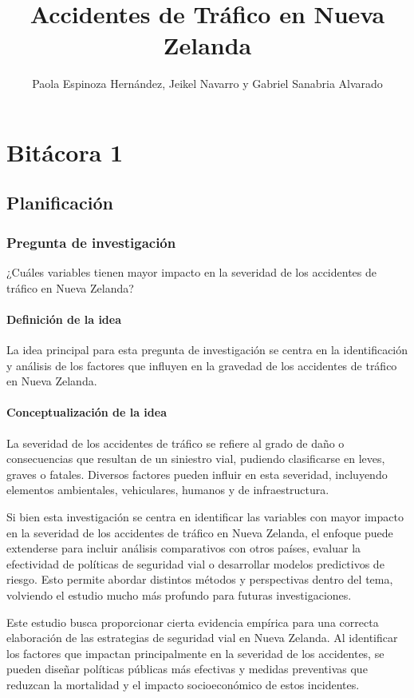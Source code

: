 \documentclass{book}
\title{Accidentes de Tráfico en Nueva Zelanda}
\author{Paola Espinoza Hernández, Jeikel Navarro y Gabriel Sanabria Alvarado}
\begin{document}
\maketitle


\chapter*{Bitácora 1}

\section{Planificación}

\subsection{Pregunta de investigación}
¿Cuáles variables tienen mayor impacto en la severidad de los accidentes de tráfico en Nueva Zelanda?

\subsubsection{Definición de la idea}

La idea principal para esta pregunta de investigación se centra en la identificación y análisis de los factores que influyen en la gravedad de los accidentes de tráfico en Nueva Zelanda. 

\subsubsection{Conceptualización de la idea}

La severidad de los accidentes de tráfico se refiere al grado de daño o consecuencias que resultan de un siniestro vial, pudiendo clasificarse en leves, graves o fatales. Diversos factores pueden influir en esta severidad, incluyendo elementos ambientales, vehiculares, humanos y de infraestructura.

Si bien esta investigación se centra en identificar las variables con mayor impacto en la severidad de los accidentes de tráfico en Nueva Zelanda, el enfoque puede extenderse para incluir análisis comparativos con otros países, evaluar la efectividad de políticas de seguridad vial o desarrollar modelos predictivos de riesgo. Esto permite abordar distintos métodos y perspectivas dentro del tema, volviendo el estudio mucho más profundo para futuras investigaciones.

Este estudio busca proporcionar cierta evidencia empírica para una correcta elaboración de las estrategias de seguridad vial en Nueva Zelanda. Al identificar los factores que impactan principalmente en la severidad de los accidentes, se pueden diseñar políticas públicas más efectivas y medidas preventivas que reduzcan la mortalidad y el impacto socioeconómico de estos incidentes.
\end{document}
